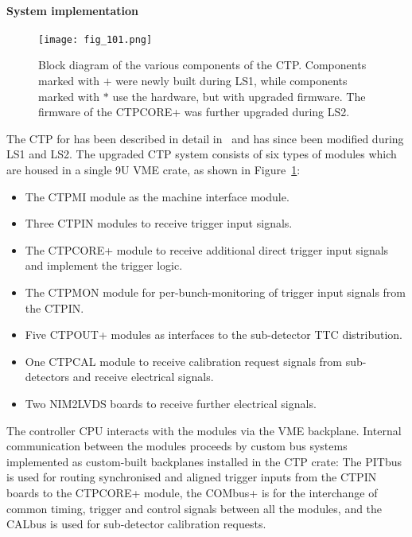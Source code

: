 \documentclass[cernpreprint, atlasdraft=false, UKenglish,british,orcidlogo, texmf, orcidlogo]{atlasdoc}
\begin{document}
\paragraph{System implementation}
\begin{figure}[htbp!]
\centerline{\texttt{[image: fig\_101.png]}}
\caption{Block diagram of the various components of the \gls{CTP}. Components marked with $+$ were newly built during \gls{LS1}, while components marked with $*$ use the \RunOne hardware, but with upgraded firmware. The firmware of the \gls{CTPCORE+} was further upgraded during \gls{LS2}.}
\label{fig:TDAQ_CTPBoards}
\end{figure}
 
The \gls{CTP} for \RunOne has been described in detail in~\cite{PERF-2007-01} and has since been modified during \gls{LS1} and \gls{LS2}.  The upgraded \gls{CTP} system consists of six types of modules which are housed in a single 9U \gls{VME} crate, as shown in Figure~\ref{fig:TDAQ_CTPBoards}:
\begin{itemize}
\item The \gls{CTPMI} module as the machine interface module.
\item Three \gls{CTPIN} modules to receive trigger input signals.
\item The \gls{CTPCORE+} module to receive additional direct trigger input signals and implement the trigger logic.
\item The \gls{CTPMON} module for per-bunch-monitoring of trigger input signals from the \gls{CTPIN}.
\item Five \gls{CTPOUT+} modules as interfaces to the sub-detector \gls{TTC} distribution.
\item One \gls{CTPCAL} module to receive calibration request signals from sub-detectors and receive electrical signals.
\item Two \gls{NIM2LVDS} boards to receive further electrical signals.
\end{itemize}
 
The controller \gls{CPU} interacts with the modules via the \gls{VME} backplane.  Internal communication between the modules proceeds by custom bus systems implemented as custom-built backplanes installed in the \gls{CTP} crate: The \gls{PITbus} is used for routing synchronised and aligned trigger inputs from the \gls{CTPIN} boards to the \gls{CTPCORE+} module, the \gls{COMbus+} is for the interchange of common timing, trigger and control signals between all the modules, and the CALbus is used for sub-detector calibration requests.
 
\end{document}
